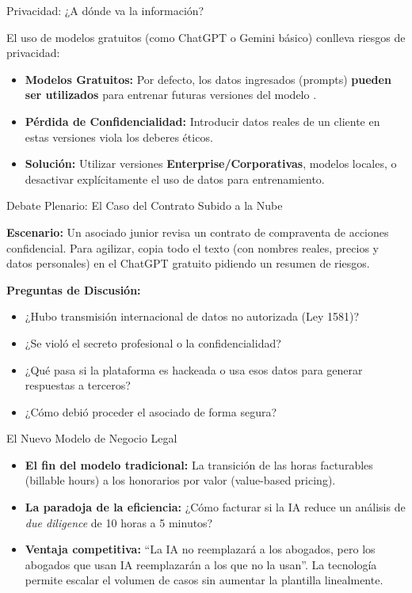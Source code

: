 \documentclass[aspectratio=169]{beamer}
\begin{document}
\begin{frame}{Privacidad: ¿A dónde va la información?}




El uso de modelos gratuitos (como ChatGPT o Gemini básico) conlleva riesgos de privacidad:

\begin{itemize}
  \item \textbf{Modelos Gratuitos:} Por defecto, los datos ingresados (prompts) \textbf{pueden ser utilizados} para entrenar futuras versiones del modelo \cite{geminiprivacy}.
  \item \textbf{Pérdida de Confidencialidad:} Introducir datos reales de un cliente en estas versiones viola los deberes éticos.
  \item \textbf{Solución:} Utilizar versiones \textbf{Enterprise/Corporativas}, modelos locales, o desactivar explícitamente el uso de datos para entrenamiento.
\end{itemize}
\end{frame}

\begin{frame}{Debate Plenario: El Caso del Contrato Subido a la Nube}


\textbf{Escenario:}
Un asociado junior revisa un contrato de compraventa de acciones confidencial. Para agilizar, copia todo el texto (con nombres reales, precios y datos personales) en el ChatGPT gratuito pidiendo un resumen de riesgos.

\textbf{Preguntas de Discusión:}
\begin{itemize}
  \item ¿Hubo transmisión internacional de datos no autorizada (Ley 1581)?
  \item ¿Se violó el secreto profesional o la confidencialidad?
  \item ¿Qué pasa si la plataforma es hackeada o usa esos datos para generar respuestas a terceros?
  \item ¿Cómo debió proceder el asociado de forma segura?
\end{itemize}
\end{frame}

\begin{frame}{El Nuevo Modelo de Negocio Legal}


\begin{itemize}
  \item \textbf{El fin del modelo tradicional:} La transición de las horas facturables (billable hours) a los honorarios por valor (value-based pricing).
  \item \textbf{La paradoja de la eficiencia:} ¿Cómo facturar si la IA reduce un análisis de \textit{due diligence} de 10 horas a 5 minutos?
  \item \textbf{Ventaja competitiva:} ``La IA no reemplazará a los abogados, pero los abogados que usan IA reemplazarán a los que no la usan''. La tecnología permite escalar el volumen de casos sin aumentar la plantilla linealmente.
\end{itemize}
\end{frame}
\end{document}
